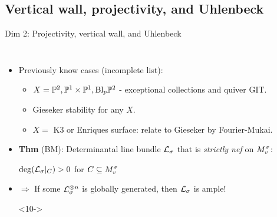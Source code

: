 \documentclass[8pt,handout]{beamer} %
\begin{document}
\subsection{{\color{purple} Vertical wall, projectivity, and Uhlenbeck}}
\begin{frame}[fragile]{Dim 2: Projectivity, vertical wall, and Uhlenbeck}
    \begin{columns}[t]
        \begin{itemize}
            \item<3-> Previously know cases (incomplete list):
            \begin{itemize}
                \item<4-> $X = \mathbb{P}^2, \mathbb{P}^1 \times \mathbb{P}^1, \text{Bl}_p \mathbb{P}^2$ - exceptional collections and quiver GIT.
                \item<5-> Gieseker stability for any $X$.
                \item<6-> $X = $ K3 or Enriques surface: relate to Gieseker by Fourier-Mukai.
            \end{itemize}
        \item<7-> \textbf{Thm} (BM): Determinantal line bundle $\mathcal{L}_\sigma$ that is \textit{strictly nef} on $M^\sigma_v$: %
        \item[] $\deg(\mathcal{L}_\sigma|_C) > 0$ for $C \subseteq M^\sigma_v$
        \item<9-> $\Rightarrow$ If some $\mathcal{L}_\sigma^{\otimes n}$ is globally generated, then $\mathcal{L}_\sigma$ is ample!
        \item[]
        \item[]<10->
        \begin{center}
\end{center}
\end{itemize}
\end{columns}
\end{frame}
\end{document}
